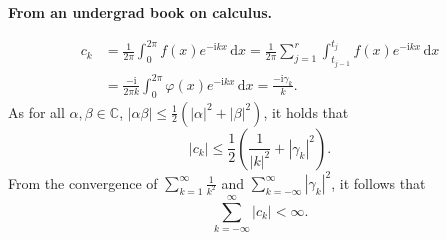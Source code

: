 \documentclass[letterpaper,landscape,KOMA,smallheadings,calcdimensions,display]{powersem}
\let\underl\textbf
\newenvironment{slide}{\raggedright}{}
\newenvironment{presentbox}{\par\begin{minipage}[t]{\linewidth}}{\end{minipage}\par}
\begin{document}
\begin{slide}
{\begin{minipage}{\linewidth}
  \underl{From an undergrad book on calculus.}
  \begin{presentbox}
    \begin{align*}
      c_k&=\frac{1}{2\pi}\int_{0}^{2\pi} f(x) e^{-\mathrm{i}kx}\,\mathrm{d}x
      =\frac{1}{2\pi}\sum_{j=1}^{r}\int_{t_{j-1}}^{t_j} f(x) e^{-\mathrm{i}kx}\,\mathrm{d}x\\
      &=\frac{-\mathrm{i}}{2\pi k}\int_{0}^{2\pi} \varphi(x) e^{-\mathrm{i}kx}\,\mathrm{d}x
      =\frac{-\mathrm{i}\gamma_k}{k}\text{.}
    \end{align*}
    As for all $\alpha,\beta\in\mathds{C}$,
    $\left|\alpha\beta\right|\leq\frac{1}{2}\left(\left|\alpha\right|^2+\left|\beta\right|^2\right)$, it holds that
    \begin{displaymath}
      \left|c_k\right|\leq\frac{1}{2}\left(\frac{1}{\left|k\right|^2}+\left|\gamma_k\right|^2\right)\text{.}
    \end{displaymath}
    From the convergence of $\sum\limits_{k=1}^{\infty}\frac{1}{k^2}$ and
    $\sum\limits_{k=-\infty}^{\infty}\left|\gamma_k\right|^2$, it follows that
    \begin{displaymath}
      \sum_{k=-\infty}^{\infty}\left|c_k\right|<\infty\text{.}
    \end{displaymath}
  \end{presentbox}
\end{minipage}%
}
{}

\ifthenelse{\isundefined{\align}\or\isundefined{\extrarowheight}}{}
{%
\newpage
  
}
\end{slide}
\end{document}
